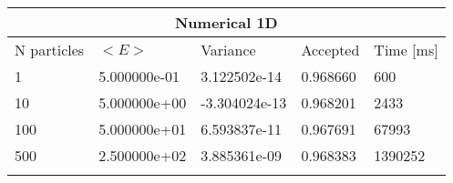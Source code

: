 \begin{tabular}{|l|l|l|l|l|}
\hline 
\multicolumn{5}{|c|}{Numerical 1D}\\ 
\hline 
N particles & $<E>$ & Variance & Accepted & Time [ms]\\ 
 \hline 
1 & 5.000000e-01 & 3.122502e-14 & 0.968660 & 600 \\ \hline 
10 & 5.000000e+00 & -3.304024e-13 & 0.968201 & 2433 \\ \hline 
100 & 5.000000e+01 & 6.593837e-11 & 0.967691 & 67993 \\ \hline 
500 & 2.500000e+02 & 3.885361e-09 & 0.968383 & 1390252 \\ \hline 
\label{h:n1} 
\end{tabular}